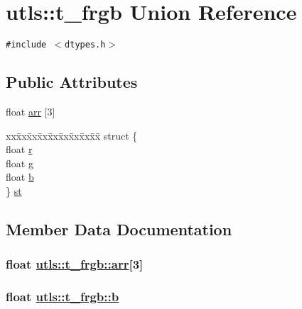 \hypertarget{unionutls_1_1t__frgb}{
\section{utls::t\_\-frgb Union Reference}
\label{unionutls_1_1t__frgb}
}
{\tt \#include $<$dtypes.h$>$}

\subsection*{Public Attributes}
\begin{CompactItemize}
\item 
float \hyperlink{unionutls_1_1t__frgb_c99ab8e9a5aa1c041c6434ecce5148f0}{arr} \mbox{[}3\mbox{]}
\item 
\begin{tabbing}
xx\=xx\=xx\=xx\=xx\=xx\=xx\=xx\=xx\=\kill
struct \{\\
\>float \hyperlink{unionutls_1_1t__frgb_09ce4de35bbd5e9bebb90a573d25a93e}{r}\\
\>float \hyperlink{unionutls_1_1t__frgb_d9307f34addd7093644c76bdc0ca4818}{g}\\
\>float \hyperlink{unionutls_1_1t__frgb_1ae1ebe078ce284461e53ab28bd1e3dd}{b}\\
\} \hyperlink{unionutls_1_1t__frgb_8356428ed028c1670bfb822c4282db10}{st}\\

\end{tabbing}\end{CompactItemize}


\subsection{Member Data Documentation}
\hypertarget{unionutls_1_1t__frgb_c99ab8e9a5aa1c041c6434ecce5148f0}{
\subsubsection[arr]{\setlength{\rightskip}{0pt plus 5cm}float \hyperlink{unionutls_1_1t__frgb_c99ab8e9a5aa1c041c6434ecce5148f0}{utls::t\_\-frgb::arr}\mbox{[}3\mbox{]}}}
\label{unionutls_1_1t__frgb_c99ab8e9a5aa1c041c6434ecce5148f0}


\hypertarget{unionutls_1_1t__frgb_1ae1ebe078ce284461e53ab28bd1e3dd}{
\subsubsection[b]{\setlength{\rightskip}{0pt plus 5cm}float \hyperlink{unionutls_1_1t__frgb_1ae1ebe078ce284461e53ab28bd1e3dd}{utls::t\_\-frgb::b}}}
\label{unionutls_1_1t__frgb_1ae1ebe078ce284461e53ab28bd1e3dd}


